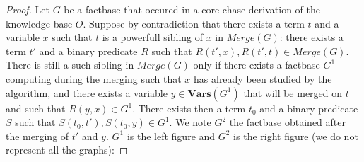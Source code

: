 \documentclass{article}
\theoremstyle{definition}
\theoremstyle{remark}
\newcommand{\Vars}{\textbf{Vars}}
\newcommand{\Merge}{\textit{Merge}}
\begin{document}
\begin{proof}
Let $G$ be a factbase that occured in a core chase derivation of the knowledge base $O$. 
Suppose by contradiction that there exists a term $t$ and a variable $x$ such that $t$ is a powerfull sibling of $x$ in $\Merge(G)$: there exists a term $t'$ and a binary predicate $R$ such that $R(t',x),R(t',t) \in \Merge(G)$. There is still a such sibling in $\Merge(G)$ only if there exists a factbase $G^1$ computing during the merging such that $x$ has already been studied by the algorithm, and there exists a variable $y \in \Vars(G^1)$ that will be merged on $t$ and such that $R(y,x) \in G^1$. There exists then a term $t_0$ and a binary predicate $S$ such that $S(t_0,t'),S(t_0,y) \in G^1$. We note $G^2$ the factbase obtained after the merging of $t'$ and $y$. $G^1$ is the left figure and $G^2$ is the right figure (we do not represent all the graphs):


\end{proof}
\end{document}
